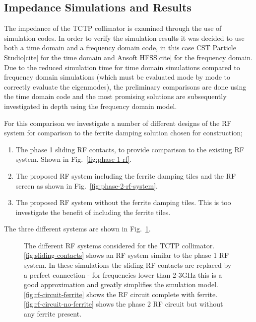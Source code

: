 \subsection{Impedance Simulations and Results}

The impedance of the TCTP collimator is examined through the use of simulation codes. In order to verify the simulation results it was decided to use both a time domain and a frequency domain code, in this case CST Particle Studio[cite] for the time domain and Ansoft HFSS[cite] for the frequency domain. Due to the reduced simulation time for time domain simulations compared to frequency domain simulations (which must be evaluated mode by mode to correctly evaluate the eigenmodes), the preliminary comparisons are done using the time domain code and the most promising solutions are subsequently investigated in depth using the frequency domain model.

For this comparison we investigate a number of different designs of the RF system for comparison to the ferrite damping solution chosen for construction;

\begin{enumerate}
\item{The phase 1 sliding RF contacts, to provide comparison to the existing RF system. Shown in Fig.~\ref{fig:phase-1-rf}.}
\item{The proposed RF system including the ferrite damping tiles and the RF screen as shown in Fig.~\ref{fig:phase-2-rf-system}.}
\item{The proposed RF system without the ferrite damping tiles. This is too investigate the benefit of including the ferrite tiles.}
\end{enumerate}

The three different systems are shown in Fig.~\ref{fig:rf-systems-tctp}. 

\begin{figure}
\subfigure[]{

\label{fig:sliding-contacts}
}
\subfigure[]{

\label{fig:rf-circuit-ferrite}
}
\subfigure[]{

\label{fig:rf-circuit-no-ferrite}
}
\label{fig:rf-systems-tctp}
\caption{The different RF systems considered for the TCTP collimator. \ref{fig:sliding-contacts} shows an RF system similar to the phase 1 RF system. In these simulations the sliding RF contacts are replaced by a perfect connection - for frequencies lower than 2-3GHz this is a good approximation and greatly simplifies the smulation model. \ref{fig:rf-circuit-ferrite} shows the RF circuit complete with ferrite. \ref{fig:rf-circuit-no-ferrite} shows the phase 2 RF circuit but without any ferrite present.}
\end{figure}

